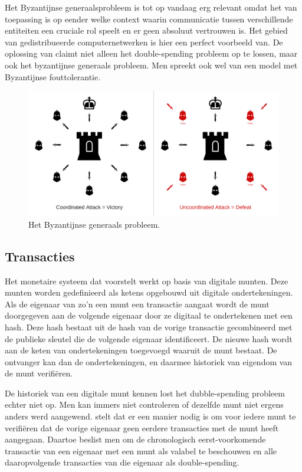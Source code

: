 			Het Byzantijnse generaalsprobleem is tot op vandaag erg relevant omdat het van toepassing is op eender welke context waarin communicatie tussen verschillende entiteiten een cruciale rol speelt en er geen absoluut vertrouwen is. Het gebied van gedistribueerde computernetwerken is hier een perfect voorbeeld van. De oplossing van \textcite{Nakamoto2008} claimt niet alleen het double-spending probleem op te lossen, maar ook het byzantijnse generaals probleem. Men spreekt ook wel van een model met Byzantijnse fouttolerantie.
			
			\begin{figure}
				\includegraphics[width=\linewidth]{img/byzantine_generals.png}
				\caption{Het Byzantijnse generaals probleem.}
				\label{fig:byzantium}
			\end{figure}
			
	\subsection{Transacties}
	Het monetaire systeem dat \textcite{Nakamoto2008} voorstelt werkt op basis van digitale munten. Deze munten worden gedefinieerd als ketens opgebouwd uit digitale ondertekeningen. Als de eigenaar van zo’n een munt een transactie aangaat wordt de munt doorgegeven aan de volgende eigenaar door ze digitaal te ondertekenen met een hash. Deze hash bestaat uit de hash van de vorige transactie gecombineerd met de publieke sleutel die de volgende eigenaar identificeert. De nieuwe hash wordt aan de keten van ondertekeningen toegevoegd waaruit de munt bestaat. De ontvanger kan dan de ondertekeningen, en daarmee historiek van eigendom van de munt verifiëren. 
			
	De historiek van een digitale munt kennen lost het dubble-spending probleem echter niet op. Men kan immers niet controleren of dezelfde munt niet ergens anders werd aangewend. \textcite{Nakamoto2008} stelt dat er een manier nodig is om voor iedere munt te verifiëren dat de vorige eigenaar geen eerdere transacties met de munt heeft aangegaan. Daartoe beslist men om de chronologisch eerst-voorkomende transactie van een eigenaar met een munt als valabel te beschouwen en alle daaropvolgende transacties van die eigenaar als double-spending. 
			
